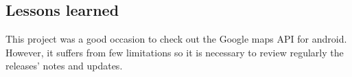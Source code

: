 \documentclass[10pt,a4paper]{article} %
\begin{document}
	\subsection{Lessons learned}

	This project was a good occasion to check out the Google maps API for android. However, it suffers from few limitations so it is necessary to review regularly the releases’ notes and updates.

    
    
    
    \nocite{*}
    
    
    

    
    
    
    
\end{document}
